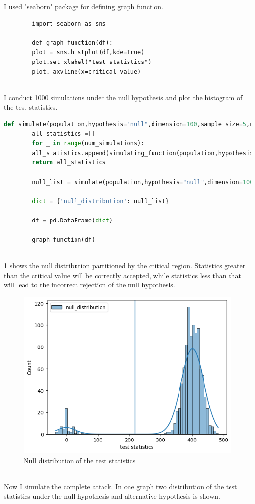 \documentclass[12pt]{extarticle}
\begin{document}
	I used "seaborn" package for defining graph function.
	\begin{lstlisting}	
		import seaborn as sns
		
		def graph_function(df):
		plot = sns.histplot(df,kde=True)
		plot.set_xlabel("test statistics")
		plot. axvline(x=critical_value)	
		
	\end{lstlisting} 
		
	 I conduct 1000 simulations under the null hypothesis and plot the histogram of the test statistics.	
	\begin{lstlisting}[language=Python]		
	def simulate(population,hypothesis="null",dimension=100,sample_size=5,num_simulations = 1000):
		all_statistics =[]
		for _ in range(num_simulations):
		all_statistics.append(simulating_function(population,hypothesis,dimension,sample_size))
		return all_statistics
		
		null_list = simulate(population,hypothesis="null",dimension=100,sample_size=5,num_simulations = 1000)
		
		dict = {'null_distribution': null_list} 
		
		df = pd.DataFrame(dict)
		
		graph_function(df)
	
	\end{lstlisting}
	\ref{fig:fig2} shows the null distribution partitioned by the critical region. Statistics greater than the critical value will be correctly accepted, while statistics less than that will lead to the incorrect rejection of the null hypothesis.
	\begin{figure}[h]
		\centering
		\includegraphics[width=1\textwidth]{im2.png}
		\caption{Null distribution of the test statistics}
		\label{fig:fig2}
	\end{figure}
		\\Now I simulate the complete attack. In one graph two distribution of the test statistics under the null hypothesis and alternative hypothesis is shown.
	
\end{document}
